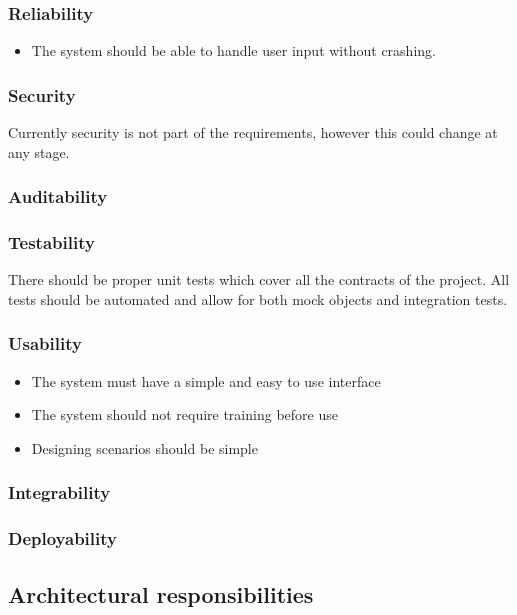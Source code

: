 \documentclass[a4paper,12pt]{report}
\begin{document}
\subsubsection{Reliability}
	\begin{itemize}
		\item The system should be able to handle user input without crashing.
	\end{itemize}

\subsubsection{Security}
Currently security is not part of the requirements, however this could change at any stage.

\subsubsection{Auditability}


\subsubsection{Testability}
There should be proper unit tests which cover all the contracts of the project. All tests should be automated and allow for both mock objects and integration tests.

\subsubsection{Usability}
	\begin{itemize}
		\item The system must have a simple and easy to use interface
		\item The system should not require training before use
		\item Designing scenarios should be simple
	\end{itemize}

\subsubsection{Integrability}

\subsubsection{Deployability}

\subsection{Architectural responsibilities}
\end{document}
